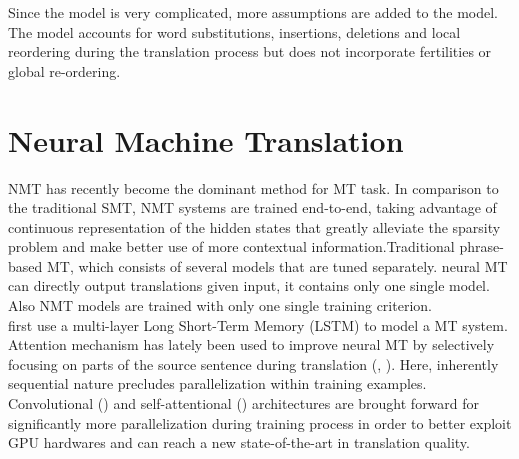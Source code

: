 Since the model is very complicated, more assumptions are added to the model. The model accounts for word substitutions, insertions, deletions and local reordering during the translation process but does not incorporate fertilities or global re-ordering.\\

%
\section{Neural Machine Translation}
NMT has recently become the dominant method for MT task. In comparison to the traditional SMT, NMT systems are trained end-to-end, taking advantage of continuous representation of the hidden states that greatly alleviate the sparsity problem and make better use of more contextual information.Traditional phrase-based MT, which consists of several models that are tuned separately. neural MT can directly output translations given input, it contains only one single model. Also NMT models are trained with only one single training criterion. \\
\cite{sutskever2014sequence} first use a multi-layer Long Short-Term Memory (LSTM) to model a MT system. Attention mechanism has lately been used to improve neural MT by selectively focusing on parts of the source sentence during translation (\cite{bahdanau2014neural}, \cite{luong2015effective}). Here, inherently sequential nature precludes parallelization within training examples. Convolutional (\cite{gehring2017convolutional}) and self-attentional (\cite{vaswani2017attention}) architectures are brought forward  for significantly more parallelization during training process in order to better exploit GPU hardwares and can reach a new state-of-the-art in
translation quality.


